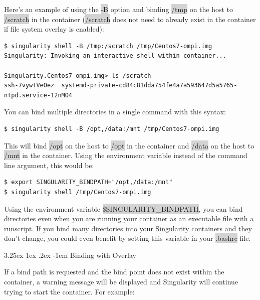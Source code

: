 \documentclass[a4paper]{article}
\makeatletter
\renewcommand\paragraph{\@startsection{paragraph}{5}{\z@}%
  {3.25ex \@plus1ex \@minus.2ex}%
  {-1em}%
  {\normalfont\normalsize\bfseries}}
\makeatother
\begin{document}
Here’s an example of using the \colorbox{lightgray}{-B} option and binding \colorbox{lightgray}{/tmp} on the host to \colorbox{lightgray}{/scratch} in the container (\colorbox{lightgray}{/scratch} does not need to already exist in the container if file system overlay is enabled):	

\begin{lstlisting}[frame=single]  
$ singularity shell -B /tmp:/scratch /tmp/Centos7-ompi.img
Singularity: Invoking an interactive shell within container...

Singularity.Centos7-ompi.img> ls /scratch
ssh-7vywtVeOez  systemd-private-cd84c81dda754fe4a7a593647d5a5765-ntpd.service-12nMO4
\end{lstlisting}


You can bind multiple directories in a single command with this syntax:\\

\begin{lstlisting}[frame=single]
$ singularity shell -B /opt,/data:/mnt /tmp/Centos7-ompi.img
\end{lstlisting}


This will bind \colorbox{lightgray}{/opt} on the host to \colorbox{lightgray}{/opt} in the container and \colorbox{lightgray}{/data} on the host to \colorbox{lightgray}{/mnt} in the container. Using the environment variable instead of the command line argument, this would be:


\begin{lstlisting}[frame=single]
$ export SINGULARITY_BINDPATH="/opt,/data:/mnt"
$ singularity shell /tmp/Centos7-ompi.img
\end{lstlisting}


Using the environment variable \colorbox{lightgray}{\$SINGULARITY\_BINDPATH}, you can bind directories even when you are running your container as an executable file with a runscript. If you bind many directories into your Singularity containers and they don’t change, you could even benefit by setting this variable in your \colorbox{lightgray}{.bashrc} file.

		\paragraph{Binding with Overlay}
		
		If a bind path is requested and the bind point does not exist within the container, a warning message will be displayed and Singularity will continue trying to start the container. For example:
		
\end{document}
